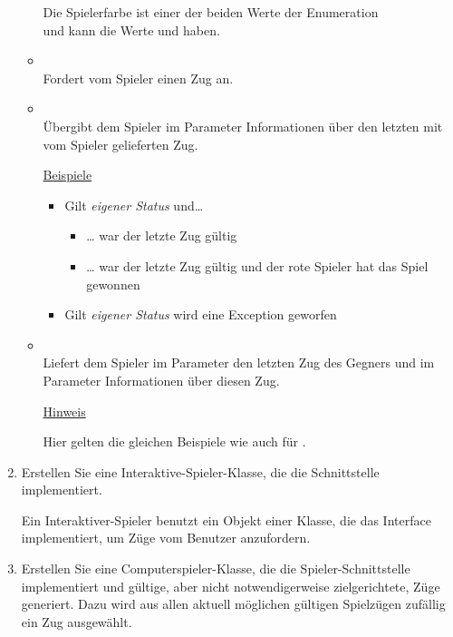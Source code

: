 \begin{enumerate}
\begin{itemize}[leftmargin=4em]
Die Spielerfarbe ist einer der beiden Werte der Enumeration \\
 und kann die Werte  und  haben.
\item[\code{request}] \hfill \\Fordert vom Spieler einen Zug an.
\item[\code{confirm}] \hfill \\Übergibt dem Spieler im Parameter  Informationen über den letzten mit  vom Spieler gelieferten Zug.

\underline{Beispiele}
\begin{itemize}
\item Gilt \textit{eigener Status} und\dots
\begin{itemize}
\item \dots {} war der letzte Zug gültig
\item \dots {} war der letzte Zug gültig und der rote Spieler hat das Spiel gewonnen
\end{itemize}
\item Gilt \textit{eigener Status} wird eine Exception geworfen
\end{itemize}
\item[\code{update}] \hfill \\Liefert dem Spieler im Parameter  den letzten Zug des Gegners und im Parameter  Informationen über diesen Zug.

\underline{Hinweis}

Hier gelten die gleichen Beispiele wie auch für .
\end{itemize}

\item Erstellen Sie eine Interaktive-Spieler-Klasse, die die Schnittstelle \\  implementiert.

Ein Interaktiver-Spieler benutzt ein Objekt einer Klasse, die das Interface \\  implementiert, um Züge vom Benutzer anzufordern.

\item Erstellen Sie eine Computerspieler-Klasse, die die Spieler-Schnittstelle implementiert und gültige, aber nicht notwendigerweise zielgerichtete, Züge generiert. Dazu wird aus allen aktuell möglichen gültigen Spielzügen zufällig ein Zug ausgewählt.


\end{enumerate}
